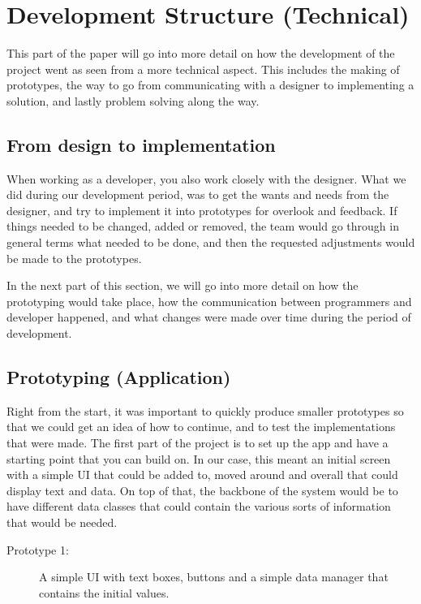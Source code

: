 \section{Development Structure (Technical)}
This part of the paper will go into more detail on how the development of the project went as seen from a more technical aspect. This includes the making of prototypes, the way to go from communicating with a designer to implementing a solution, and lastly problem solving along the way.

\subsection{From design to implementation}
When working as a developer, you also work closely with the designer. What we did during our development period, was to get the wants and needs from the designer, and try to implement it into prototypes for overlook and feedback. 
If things needed to be changed, added or removed, the team would go through in general terms what needed to be done, and then the requested adjustments would be made to the prototypes.

In the next part of this section, we will go into more detail on how the prototyping would take place, how the communication between programmers and developer happened, and what changes were made over time during the period of development.

\subsection{Prototyping (Application)}
Right from the start, it was important to quickly produce smaller prototypes so that we could get an idea of how to continue, and to test the implementations that were made. The first part of the project is to set up the app and have a starting point that you can build on. In our case, this meant an initial screen with a simple UI that could be added to, moved around and overall that could display text and data. On top of that, the backbone of the system would be to have different data classes that could contain the various sorts of information that would be needed.

\begin{description}
\item[Prototype 1:] A simple UI with text boxes, buttons and a simple data manager that contains the initial values.
\end{description}

